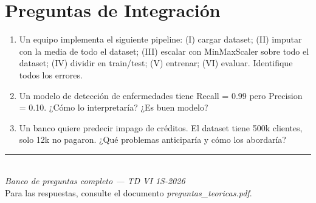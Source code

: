 \documentclass[11pt,a4paper]{article}
\begin{document}
\section{Preguntas de Integraci\'on}

\begin{enumerate}[label=\textbf{P\arabic*.}, resume]

\item Un equipo implementa el siguiente pipeline: (I) cargar dataset; (II) imputar con la
  media de todo el dataset; (III) escalar con MinMaxScaler sobre todo el dataset; (IV)
  dividir en train/test; (V) entrenar; (VI) evaluar. Identifique todos los errores.

\item Un modelo de detecci\'on de enfermedades tiene Recall = 0.99 pero Precision = 0.10.
  ¿C\'omo lo interpretar\'ia? ¿Es buen modelo?

\item Un banco quiere predecir impago de cr\'editos. El dataset tiene 500k clientes,
  solo 12k no pagaron. ¿Qu\'e problemas anticipar\'ia y c\'omo los abordar\'ia?

\end{enumerate}

\vspace{1cm}
\begin{center}
\rule{0.8\linewidth}{1pt}\\[6pt]
{\itshape Banco de preguntas completo --- TD VI 1S-2026}\\[4pt]
{\small\color{gray} Para las respuestas, consulte el documento \textit{preguntas\_teoricas.pdf}.}
\end{center}
\end{document}
